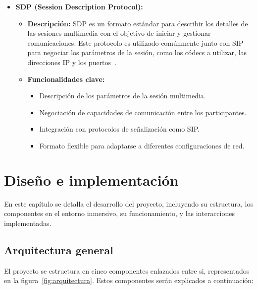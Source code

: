 \documentclass[a4paper, 12pt]{book}
\begin{document}
\begin{itemize}
  \item \textbf{SDP (Session Description Protocol):}
    \begin{itemize}
      \item \textbf{Descripción:} SDP es un formato estándar para describir los detalles de las sesiones multimedia con el objetivo de iniciar y gestionar comunicaciones. 
      Este protocolo es utilizado comúnmente junto con SIP para negociar los parámetros de la sesión, como los códecs a utilizar, 
      las direcciones IP y los puertos~\cite{Documentacion_SDP}.
      \item \textbf{Funcionalidades clave:}
      \begin{itemize}
        \item Descripción de los parámetros de la sesión multimedia.
        \item Negociación de capacidades de comunicación entre los participantes.
        \item Integración con protocolos de señalización como SIP.
        \item Formato flexible para adaptarse a diferentes configuraciones de red.
      \end{itemize}
    \end{itemize}
  
\end{itemize}




\cleardoublepage
\chapter{Diseño e implementación}
\label{chap:diseno}

En este capítulo se detalla el desarrollo del proyecto, incluyendo su estructura, los componentes en el entorno 
inmersivo, su funcionamiento, y las interacciones implementadas.


\section{Arquitectura general} 
\label{sec:arquitectura}

El proyecto se estructura en cinco componentes enlazados entre si, representados en la figura~\ref{fig:arquitectura}. Estos componentes serán explicados a continuación:
\end{document}
